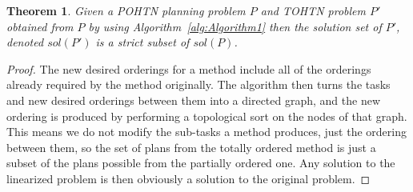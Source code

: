 \documentclass[letterpaper]{article}
\newtheorem{theorem}{Theorem}
\newtheorem{proof}{Proof}
\begin{document}
\begin{theorem}\label{thm:Soundness}
	Given a POHTN planning problem $P$ and TOHTN problem
	$P'$ obtained from $P$ by using Algorithm~\ref{alg:Algorithm1}
	then the solution set of $P'$, denoted $sol(P')$ is a strict subset of $sol(P)$.
\end{theorem}
\begin{proof}
	The new desired orderings for a method include all of the orderings already required by the method originally. The algorithm then turns the tasks and new desired orderings between them into a directed graph, and the new ordering is produced by performing a topological sort on the nodes of that graph. This means we do not modify the sub-tasks a method produces, just the ordering between them, so the set of plans from the totally ordered method is just a subset of the plans possible from the partially ordered one. Any solution to the linearized problem is then obviously a solution to the original problem.
\end{proof}
\end{document}
